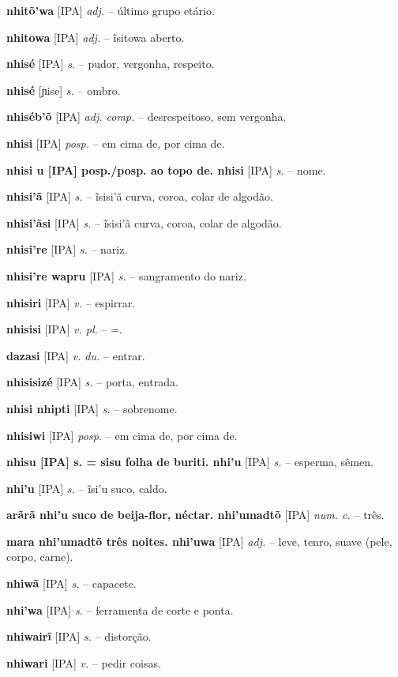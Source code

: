 \textbf{nhitõ'wa} [IPA] \textit{adj.} -- último grupo etário.

\textbf{nhitowa} [IPA] \textit{adj.} -- ĩsitowa aberto.

\textbf{nhisé} [IPA] \textit{s.} -- pudor, vergonha, respeito.

\textbf{nhisé} [ɲise] \textit{s.} -- ombro.

\textbf{nhiséb'õ} [IPA] \textit{adj. comp.} -- desrespeitoso, sem vergonha.

\textbf{nhisi} [IPA] \textit{posp.} -- em cima de, por cima de.

\textbf{nhisi u [IPA] posp./posp. ao topo de. nhisi} [IPA] \textit{s.} -- nome.

\textbf{nhisi'ã} [IPA] \textit{s.} -- ĩsisi'ã curva, coroa, colar de algodão.

\textbf{nhisi'ãsi} [IPA] \textit{s.} -- ĩsisi'ã curva, coroa, colar de algodão.

\textbf{nhisi're} [IPA] \textit{s.} -- nariz.

\textbf{nhisi're wapru} [IPA] \textit{s.} -- sangramento do nariz.

\textbf{nhisiri} [IPA] \textit{v.} -- espirrar.

\textbf{nhisisi} [IPA] \textit{v. pl.} -- =.

\textbf{dazasi} [IPA] \textit{v. du.} -- entrar.

\textbf{nhisisizé} [IPA] \textit{s.} -- porta, entrada.

\textbf{nhisi nhipti} [IPA] \textit{s.} -- sobrenome.

\textbf{nhisiwi} [IPA] \textit{posp.} -- em cima de, por cima de.

\textbf{nhisu [IPA] s. = sisu folha de buriti. nhi'u} [IPA] \textit{s.} -- esperma, sêmen.

\textbf{nhi'u} [IPA] \textit{s.} -- ĩsi'u suco, caldo.

\textbf{arãrã nhi'u suco de beija-flor, néctar. nhi'umadtõ} [IPA] \textit{num. c.} -- três.

\textbf{mara nhi'umadtõ três noites. nhi'uwa} [IPA] \textit{adj.} -- leve, tenro, suave (pele, corpo, carne).

\textbf{nhiwã} [IPA] \textit{s.} -- capacete.

\textbf{nhi'wa} [IPA] \textit{s.} -- ferramenta de corte e ponta.

\textbf{nhiwairĩ} [IPA] \textit{s.} -- distorção.

\textbf{nhiwari} [IPA] \textit{v.} -- pedir coisas.

